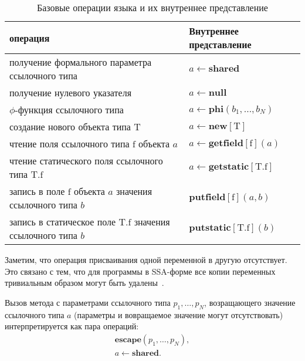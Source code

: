\documentclass[14pt,titlepage,draft]{extarticle}
\newcommand{\java}{\eng{Java}\xspace}
\let\mathphi\phi
\renewcommand{\phi}{\ensuremath{\mathphi}}
\newcommand{\type}[1]{\mathrm{#1}}
\newcommand{\field}[1]{\mathrm{#1}}
\newcommand{\sfield}[2]{\type{#1}.\field{#2}}
\newcommand{\op}[1]{\mathbf{#1}}
\begin{document}
    \begin{table}[htb]
      \centering

      \begin{tabular}{|p{}|p{}|}\hline
        \textbf{\java операция} &
          \textbf{Внутреннее представление}\\ \hline

        получение формального параметра ссылочного типа
        & $a \gets \op{shared}$
        \\ \hline

        получение нулевого указателя
        & $a \gets \op{null}$
        \\ \hline

        \phi-функция ссылочного типа
        & $a \gets \op{phi}(b_1, \ldots, b_N)$
        \\ \hline

        создание нового объекта типа $\type{T}$
        & $a \gets \op{new}[\type{T}]$
        \\ \hline

        чтение поля ссылочного типа $\field{f}$ объекта $a$
        & $a \gets \op{getfield}[\field{f}](a)$
        \\ \hline

        чтение статического поля ссылочного типа $\sfield{T}{f}$
        & $a \gets \op{getstatic}[\sfield{T}{f}]$
        \\ \hline

        запись в поле $\field{f}$ объекта $a$ значения ссылочного типа $b$
        & $\op{putfield}[\field{f}](a, b)$
        \\ \hline

        запись в статическое поле $\sfield{T}{f}$ значения ссылочного типа $b$
        & $\op{putstatic}[\sfield{T}{f}](b)$
        \\ \hline

      \end{tabular}
      \caption{Базовые операции языка \java и их внутреннее представление}
      \label{tabular:basic_operations}
    \end{table}

    Заметим, что операция присваивания одной переменной в другую отсутствует.
    Это связано с тем, что для программы в SSA-форме все копии переменных
    тривиальным образом могут быть удалены~\cite{ssa}.

    Вызов метода с параметрами ссылочного типа $p_1, \ldots, p_N$, возращающего
    значение ссылочного типа $a$ (параметры и вовращаемое значение могут
    отсутствовать) интерпретируется как пара операций:
    \begin{gather}
      \op{escape}(p_1, \ldots, p_N), \\
      a \gets \op{shared}.
    \end{gather}
\end{document}
